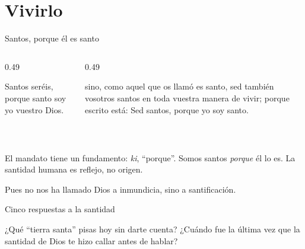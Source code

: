 \section{Vivirlo}

\begin{frame}{Santos, porque él es santo}
\begin{columns}[t,onlytextwidth]
\begin{column}{0.49\textwidth}
\begin{cita}Santos seréis, porque santo soy yo \SENOR{} vuestro Dios.\end{cita}
\begin{center}\small{}\\ \end{center}
\end{column}
\begin{column}{0.49\textwidth}
\begin{cita}sino, como aquel que os llamó es santo, sed también vosotros santos en toda vuestra manera de vivir; porque escrito está: Sed santos, porque yo soy santo.\end{cita}
\end{column}
\end{columns}
\small El mandato tiene un fundamento:  \emph{ki}, ``porque''. Somos santos \emph{porque} él lo es. La santidad humana es reflejo, no origen.\par\smallskip
\begin{cita}Pues no nos ha llamado Dios a inmundicia, sino a santificación.\end{cita}
\end{frame}

\begin{frame}{Cinco respuestas a la santidad}
\centering
{}\par\medskip
\small\RaggedRight ¿Qué ``tierra santa'' pisas hoy sin darte cuenta? ¿Cuándo fue la última vez que la santidad de Dios te hizo callar antes de hablar?
\end{frame}

